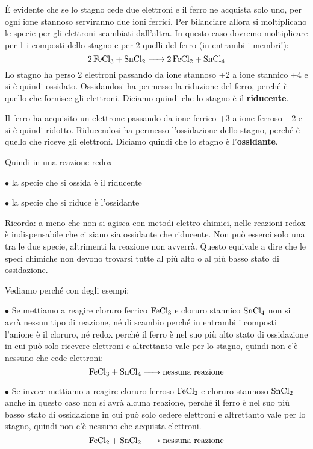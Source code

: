 È evidente che se lo stagno cede due elettroni e il ferro ne acquista solo uno, per ogni ione stannoso serviranno due ioni ferrici.
Per bilanciare allora si moltiplicano le specie per gli elettroni scambiati dall'altra.
In questo caso dovremo moltiplicare per 1 i composti dello stagno e per 2 quelli del ferro (in entrambi i membri!):
$$\ce{2 FeCl_3 + SnCl_2 -> 2 FeCl_2 + SnCl_4}$$
Lo stagno ha perso 2 elettroni passando da ione stannoso +2 a ione stannico +4 e si è quindi ossidato. Ossidandosi ha permesso la riduzione del ferro, perché è quello che fornisce gli elettroni. Diciamo quindi che lo stagno è il \textbf{riducente}.

Il ferro ha acquisito un elettrone passando da ione ferrico +3 a ione ferroso +2 e si è quindi ridotto. Riducendosi ha permesso l'ossidazione dello stagno, perché è quello che riceve gli elettroni. Diciamo quindi che lo stagno è l'\textbf{ossidante}.

\vspace{0.2cm}Quindi in una reazione redox

\vspace{0.2cm}$\bullet$ la specie che si ossida è il riducente

\vspace{0.2cm}$\bullet$ la specie che si riduce è l'ossidante

\vspace{0.2cm}Ricorda: a meno che non si agisca con metodi elettro-chimici, nelle reazioni redox è indispensabile che ci siano sia ossidante che riducente. Non può esserci solo una tra le due specie, altrimenti la reazione non avverrà. Questo equivale a dire che le speci chimiche non devono trovarsi tutte al più alto o al più basso stato di ossidazione.

Vediamo perché con degli esempi:

\vspace{0.2cm}$\bullet$ Se mettiamo a reagire cloruro ferrico $\rm FeCl_3$ e cloruro stannico $\rm SnCl_4$ non si avrà nessun tipo di reazione, né di scambio perché in entrambi i composti l'anione è il cloruro, né redox perché il ferro è nel suo più alto stato di ossidazione in cui può solo ricevere elettroni e altrettanto vale per lo stagno, quindi non c'è nessuno che cede elettroni:
$$\ce{FeCl_3 +  SnCl_4 ->}\text{nessuna reazione}$$

\vspace{0.2cm}$\bullet$ Se invece mettiamo a reagire cloruro ferroso $\rm FeCl_2$ e cloruro stannoso $\rm SnCl_2$ anche in questo caso non si avrà alcuna reazione, perché il ferro è nel suo più basso stato di ossidazione in cui può solo cedere elettroni e altrettanto vale per lo stagno, quindi non c'è nessuno che acquista elettroni.
$$\ce{FeCl_2 + SnCl_2 ->}\text{nessuna reazione}$$
